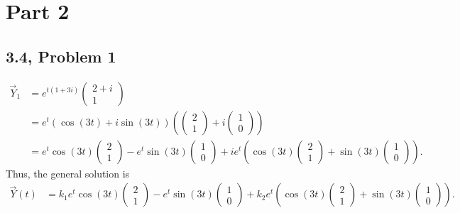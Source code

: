 \documentclass[10pt]{mypackage}
\begin{document}
\section{Part 2}%
\subsection{3.4, Problem 1}%
\begin{align*}
  \vec{Y}_1 &= e^{t\left(1 + 3i\right)} \begin{pmatrix}2 + i \\ 1\end{pmatrix}\\
            &= e^{t}\left(\cos\left(3t\right) + i\sin\left(3t\right)\right) \left( \begin{pmatrix}2\\1\end{pmatrix} + i \begin{pmatrix}1\\0\end{pmatrix}\right)\\
            &= e^{t}\cos\left(3t\right) \begin{pmatrix}2\\1\end{pmatrix} - e^{t}\sin\left(3t\right) \begin{pmatrix}1\\0\end{pmatrix} + ie^{t}\left(\cos\left(3t\right) \begin{pmatrix}2\\1\end{pmatrix} + \sin\left(3t\right) \begin{pmatrix}1\\0\end{pmatrix}\right).
\end{align*}
Thus, the general solution is
\begin{align*}
  \vec{Y}(t) &= k_1e^{t}\cos\left(3t\right) \begin{pmatrix}2\\1\end{pmatrix} - e^{t}\sin\left(3t\right) \begin{pmatrix}1\\0\end{pmatrix} + k_2e^{t}\left(\cos\left(3t\right) \begin{pmatrix}2\\1\end{pmatrix} + \sin\left(3t\right) \begin{pmatrix}1\\0\end{pmatrix}\right).
\end{align*}
\end{document}

